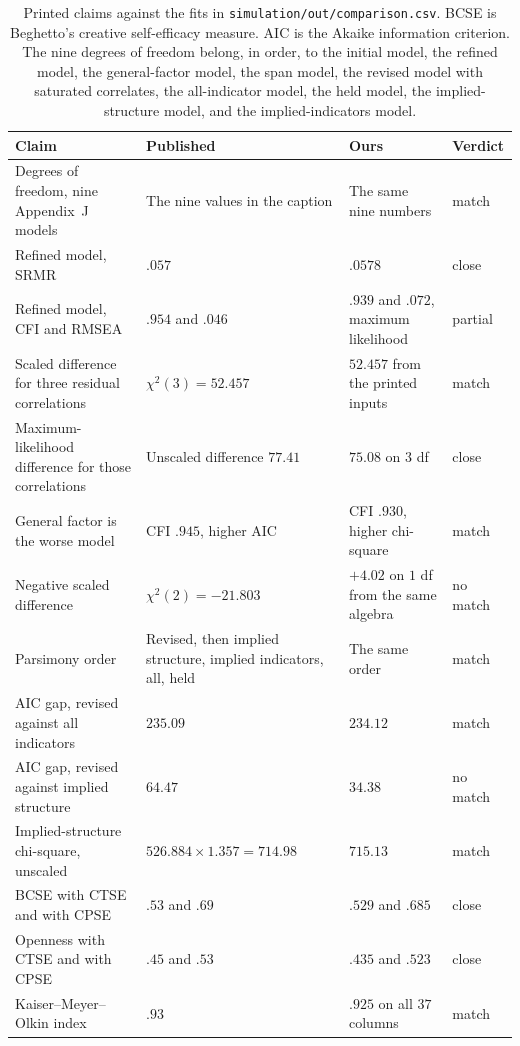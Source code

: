 \documentclass[11pt]{article}
\begin{document}
\begin{table}[ht]
\centering
\small
\begin{tabular}{@{}p{}p{}p{}p{}@{}}
\toprule
Claim & Published & Ours & Verdict \\
\midrule
Degrees of freedom, nine Appendix~J models &
The nine values in the caption &
The same nine numbers &
match \\
Refined model, SRMR &
\(.057\) &
\(.0578\) &
close \\
Refined model, CFI and RMSEA &
\(.954\) and \(.046\) &
\(.939\) and \(.072\), maximum likelihood &
partial \\
Scaled difference for three residual correlations &
\(\chi^2(3)=52.457\) &
\(52.457\) from the printed inputs &
match \\
Maximum-likelihood difference for those correlations &
Unscaled difference \(77.41\) &
\(75.08\) on \(3\) df &
close \\
General factor is the worse model &
CFI \(.945\), higher AIC &
CFI \(.930\), higher chi-square &
match \\
Negative scaled difference &
\(\chi^2(2)=-21.803\) &
\(+4.02\) on \(1\) df from the same algebra &
no match \\
Parsimony order &
Revised, then implied structure, implied indicators, all, held &
The same order &
match \\
AIC gap, revised against all indicators &
\(235.09\) &
\(234.12\) &
match \\
AIC gap, revised against implied structure &
\(64.47\) &
\(34.38\) &
no match \\
Implied-structure chi-square, unscaled &
\(526.884\times 1.357=714.98\) &
\(715.13\) &
match \\
BCSE with CTSE and with CPSE &
\(.53\) and \(.69\) &
\(.529\) and \(.685\) &
close \\
Openness with CTSE and with CPSE &
\(.45\) and \(.53\) &
\(.435\) and \(.523\) &
close \\
Kaiser--Meyer--Olkin index &
\(.93\) &
\(.925\) on all \(37\) columns &
match \\
\bottomrule
\end{tabular}
\caption{Printed claims against the fits in
\texttt{simulation/out/comparison.csv}.
BCSE is Beghetto's creative self-efficacy measure.
AIC is the Akaike information criterion.
The nine degrees of freedom belong, in order, to the initial model,
the refined model, the general-factor model, the span model, the
revised model with saturated correlates, the all-indicator model, the
held model, the implied-structure model, and the implied-indicators
model.}
\label{tab:compare}
\end{table}
\end{document}
